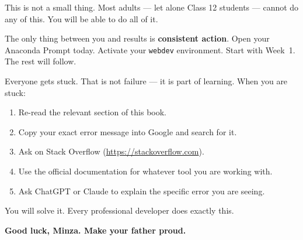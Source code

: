 \documentclass[12pt, a4paper]{book}
\begin{document}
This is not a small thing. Most adults --- let alone Class 12 students ---
cannot do any of this. You will be able to do all of it.

\bigskip

The only thing between you and results is \textbf{consistent action}.
Open your Anaconda Prompt today. Activate your \texttt{webdev} environment.
Start with Week~1. The rest will follow.

\bigskip

\begin{tcolorbox}[tipbox, title={Final Tip: When You Get Stuck}]
Everyone gets stuck. That is not failure --- it is part of learning.
When you are stuck:
\begin{enumerate}
  \item Re-read the relevant section of this book.
  \item Copy your exact error message into Google and search for it.
  \item Ask on Stack Overflow (\url{https://stackoverflow.com}).
  \item Use the official documentation for whatever tool you are working with.
  \item Ask ChatGPT or Claude to explain the specific error you are seeing.
\end{enumerate}
You will solve it. Every professional developer does exactly this.
\end{tcolorbox}

\bigskip
\begin{center}
  {\Large\bfseries Good luck, Minza. Make your father proud. 🚀}
\end{center}

\end{document}
